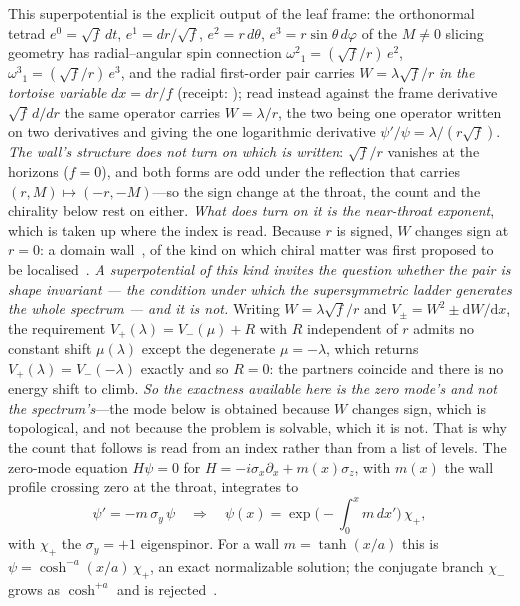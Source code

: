 \documentclass[11pt]{article}
\newcommand{\dd}{\mathrm{d}}
\begin{document}
This superpotential is the explicit output of the leaf frame: the orthonormal tetrad $e^0=\sqrt f\,dt$, $e^1=dr/\sqrt f$, $e^2=r\,d\theta$, $e^3=r\sin\theta\,d\varphi$ of the $M\neq0$ slicing geometry has radial--angular spin connection $\omega^2{}_1=(\sqrt f/r)\,e^2$, $\omega^3{}_1=(\sqrt f/r)\,e^3$, and the radial first-order pair carries $W=\lambda\sqrt f/r$ \emph{in the tortoise variable} $dx=dr/f$ (receipt: ); read instead against the frame derivative $\sqrt f\,d/dr$ the same operator carries $W=\lambda/r$, the two being one operator written on two derivatives and giving the one logarithmic derivative $\psi'/\psi=\lambda/(r\sqrt f)$. \emph{The wall's structure does not turn on which is written}: $\sqrt f/r$ vanishes at the horizons ($f=0$), and both forms are odd under the reflection that carries $(r,M)\mapsto(-r,-M)$---so the sign change at the throat, the count and the chirality below rest on either. \emph{What does turn on it is the near-throat exponent}, which is taken up where the index is read. Because $r$ is signed, $W$ changes sign at $r=0$: a domain wall~\cite{JackiwRebbi1976}, of the kind on which chiral matter was first proposed to be localised~\cite{RubakovShaposhnikov1983}. \emph{A superpotential of this kind invites the question whether the pair is \emph{shape invariant} — the condition under which the supersymmetric ladder generates the whole spectrum — and it is not.} Writing $W=\lambda\sqrt f/r$ and $V_{\pm}=W^{2}\pm\dd W/\dd x$, the requirement $V_{+}(\lambda)=V_{-}(\mu)+R$ with $R$ independent of $r$ admits no constant shift $\mu(\lambda)$ except the degenerate $\mu=-\lambda$, which returns $V_{+}(\lambda)=V_{-}(-\lambda)$ exactly and so $R=0$: the partners coincide and there is no energy shift to climb. \emph{So the exactness available here is the zero mode's and not the spectrum's}---the mode below is obtained because $W$ changes sign, which is topological, and not because the problem is solvable, which it is not. That is why the count that follows is read from an index rather than from a list of levels. The zero-mode equation $H\psi=0$ for $H=-i\sigma_x\partial_x+m(x)\sigma_z$, with $m(x)$ the wall profile crossing zero at the throat, integrates to
\begin{equation}
\psi'=-m\,\sigma_y\,\psi\quad\Longrightarrow\quad \psi(x)=\exp\!\Big(-\!\int_0^x m\,dx'\Big)\,\chi_{+},
\end{equation}
with $\chi_+$ the $\sigma_y=+1$ eigenspinor. For a wall $m=\tanh(x/a)$ this is $\psi=\cosh^{-a}(x/a)\,\chi_+$, an exact normalizable solution; the conjugate branch $\chi_-$ grows as $\cosh^{+a}$ and is rejected~\cite{CallanHarvey1985}.
\end{document}
